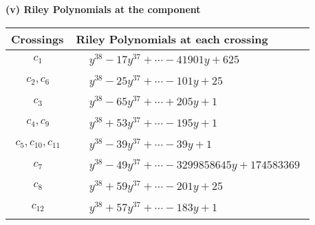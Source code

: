 \documentclass[1p]{elsarticle_modified}
\theoremstyle{definition}
\begin{document}
\newpage\renewcommand{\arraystretch}{1}
\flushleft \textbf{(v) Riley Polynomials at the component}\newline \\
\begin{tabular}{m{50pt}|m{274pt}}
Crossings & \hspace{64pt}Riley Polynomials at each crossing \\
\hline $$\begin{aligned}c_{1}\end{aligned}$$&$\begin{aligned}
&y^{38}-17 y^{37}+\cdots-41901 y+625
\end{aligned}$\\
\hline $$\begin{aligned}c_{2},c_{6}\end{aligned}$$&$\begin{aligned}
&y^{38}-25 y^{37}+\cdots-101 y+25
\end{aligned}$\\
\hline $$\begin{aligned}c_{3}\end{aligned}$$&$\begin{aligned}
&y^{38}-65 y^{37}+\cdots+205 y+1
\end{aligned}$\\
\hline $$\begin{aligned}c_{4},c_{9}\end{aligned}$$&$\begin{aligned}
&y^{38}+53 y^{37}+\cdots-195 y+1
\end{aligned}$\\
\hline $$\begin{aligned}c_{5},c_{10},c_{11}\end{aligned}$$&$\begin{aligned}
&y^{38}-39 y^{37}+\cdots-39 y+1
\end{aligned}$\\
\hline $$\begin{aligned}c_{7}\end{aligned}$$&$\begin{aligned}
&y^{38}-49 y^{37}+\cdots-3299858645 y+174583369
\end{aligned}$\\
\hline $$\begin{aligned}c_{8}\end{aligned}$$&$\begin{aligned}
&y^{38}+59 y^{37}+\cdots-201 y+25
\end{aligned}$\\
\hline $$\begin{aligned}c_{12}\end{aligned}$$&$\begin{aligned}
&y^{38}+57 y^{37}+\cdots-183 y+1
\end{aligned}$\\
\hline
\end{tabular}\\~\\
\end{document}
